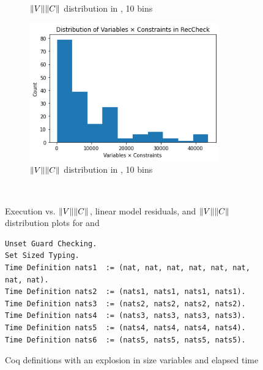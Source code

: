 \begin{figure}
\begin{subfigure}{0.475\textwidth}
\caption{$\lVert V\rVert\lVert C\rVert$ distribution in \solve, 10 bins}
\label{fig:stats:distr-solve}
\end{subfigure}
\hfill
\begin{subfigure}{0.475\textwidth}
\includegraphics[width=0.9\textwidth]{images/distribution-RecCheck.png}
\caption{$\lVert V\rVert\lVert C\rVert$ distribution in \RecCheck, 10 bins}
\label{fig:stats:distr-reccheck}
\end{subfigure}
\\[2ex]
\caption{Execution vs. $\lVert V\rVert\lVert C\rVert$, linear model residuals, and $\lVert V\rVert\lVert C\rVert$ distribution plots for \solve and \RecCheck}
\label{fig:stats}
\end{figure}

\begin{figure}
\begin{verbatim}
Unset Guard Checking.
Set Sized Typing.
Time Definition nats1  := (nat, nat, nat, nat, nat, nat, nat, nat).
Time Definition nats2  := (nats1, nats1, nats1, nats1).
Time Definition nats3  := (nats2, nats2, nats2, nats2).
Time Definition nats4  := (nats3, nats3, nats3, nats3).
Time Definition nats5  := (nats4, nats4, nats4, nats4).
Time Definition nats6  := (nats5, nats5, nats5, nats5).
\end{verbatim}
\caption{Coq definitions with an explosion in size variables and elapsed time}
\label{fig:nats}
\end{figure}